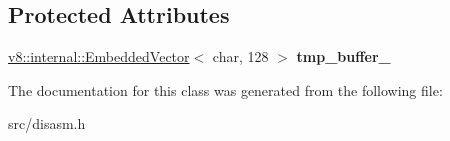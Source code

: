 \subsection*{Protected Attributes}
\begin{DoxyCompactItemize}
\item 
\hypertarget{classdisasm_1_1_name_converter_a5badefd2fdf514300cea532e79721915}{}\hyperlink{classv8_1_1internal_1_1_embedded_vector}{v8\+::internal\+::\+Embedded\+Vector}$<$ char, 128 $>$ {\bfseries tmp\+\_\+buffer\+\_\+}\label{classdisasm_1_1_name_converter_a5badefd2fdf514300cea532e79721915}

\end{DoxyCompactItemize}


The documentation for this class was generated from the following file\+:\begin{DoxyCompactItemize}
\item 
src/disasm.\+h\end{DoxyCompactItemize}
